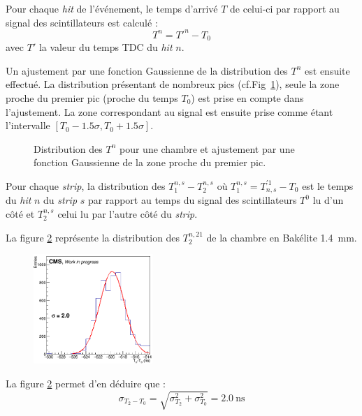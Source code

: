 Pour chaque \textit{hit} de l'événement, le temps d'arrivé $T$ de celui-ci par rapport au signal des scintillateurs est calculé :
\begin{equation}
	T^n=T'^n-T_0
\end{equation}
avec $T'$ la valeur du temps TDC du \textit{hit} $n$. 

Un ajustement par une fonction Gaussienne de la distribution des $T^n$ est ensuite effectué. La distribution présentant de nombreux pics (cf.Fig~\ref{pics}), seule la zone proche du premier pic (proche du temps $T_0$) est prise en compte dans l'ajustement. La zone correspondant au signal est ensuite prise comme étant l'intervalle $\left[T_0-\num{1.5}\sigma,T_0+\num{1.5}\sigma\right]$.

\begin{figure}[!ht]
	\centering
	\caption{Distribution des $T^n$ pour une chambre et ajustement par une fonction Gaussienne de la zone proche du premier pic.}
	\label{pics}
\end{figure}

Pour chaque \textit{strip}, la distribution des $T^{n,s}_1-T^{n,s}_2$ où $T^{n,s}_1=T_{n,s}^{'1}-T_0$ est le temps du \textit{hit} $n$ du \textit{strip} $s$ par rapport au temps du signal des scintillateurs $T^{0}$ lu d'un côté et $T^{n,s}_2$ celui lu par l'autre côté du \textit{strip}.

La figure \ref{t2t0} représente la distribution des $T^{n,21}_2$ de la chambre en Bakélite \SI{1.4}{\milli\meter}.
\begin{figure}[ht!]
	\centering
	\includegraphics[width=0.40\textwidth]{ELE/TimingFitsRunT1T0_zoom_736185.jpg}
	\label{t2t0}
\end{figure}

La figure \ref{t2t0} permet d'en déduire que :
\begin{equation}
\sigma_{T_2-T_0}=\sqrt{\sigma_{T_2}^2+\sigma_{T_0}^2}=\SI{2.0}{\nano\second}
\end{equation}

